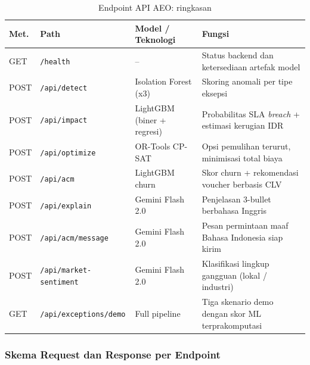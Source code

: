 \documentclass[12pt,a4paper]{article}
\begin{document}
\begin{table}[H]
  \centering\footnotesize
  \caption{Endpoint API AEO: ringkasan}
  \begin{tabularx}{\textwidth}{L{0.9cm} L{4.0cm} L{3.0cm} Y}
    \toprule
    \textbf{Met.} & \textbf{Path} & \textbf{Model / Teknologi} & \textbf{Fungsi} \\
    \midrule
    GET  & \texttt{/health}               & --                         & Status backend dan ketersediaan artefak model \\
    POST & \texttt{/api/detect}           & Isolation Forest (x3)      & Skoring anomali per tipe eksepsi \\
    POST & \texttt{/api/impact}           & LightGBM (biner + regresi) & Probabilitas SLA \textit{breach} + estimasi kerugian IDR \\
    POST & \texttt{/api/optimize}         & OR-Tools CP-SAT            & Opsi pemulihan terurut, minimisasi total biaya \\
    POST & \texttt{/api/acm}              & LightGBM churn             & Skor churn + rekomendasi voucher berbasis CLV \\
    POST & \texttt{/api/explain}          & Gemini Flash 2.0           & Penjelasan 3-bullet berbahasa Inggris \\
    POST & \texttt{/api/acm/message}      & Gemini Flash 2.0           & Pesan permintaan maaf Bahasa Indonesia siap kirim \\
    POST & \texttt{/api/market-sentiment} & Gemini Flash 2.0           & Klasifikasi lingkup gangguan (lokal / industri) \\
    GET  & \texttt{/api/exceptions/demo}  & Full pipeline              & Tiga skenario demo dengan skor ML terprakomputasi \\
    \bottomrule
  \end{tabularx}
\end{table}

\subsubsection{Skema Request dan Response per Endpoint}
\end{document}
